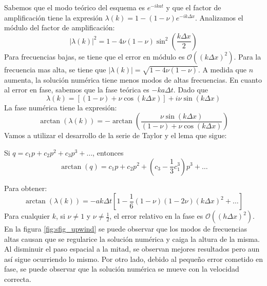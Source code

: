 \documentclass[spanish]{mathnotes}
\begin{document}
	Sabemos que el modo teórico del esquema es $e^{-ik at}$ y que el factor de amplificación tiene la expresión $\lambda(k) = 1-(1-\nu) e^{-ik\Delta x}$. Analizamos el módulo del factor de amplificación:
	$$|\lambda(k)|^2= 1-4\nu (1-\nu)\sin^2\left(\frac{k\Delta x}{2}\right)$$
	Para frecuencias bajas, se tiene que el error en módulo es $\mathcal{O}((k\Delta x)^2)$. Para la frecuencia mas alta, se tiene que $|\lambda(k)| = \sqrt{1-4\nu(1-\nu)}$. 
	A medida que $n$ aumenta, la solución numérica tiene menos modos de altas frecuencias.
	En cuanto al error en fase, sabemos que la fase teórica es $-ka\Delta t$. 
	Dado que 
	$$\lambda(k)=\left[(1-\nu)+\nu \cos(k\Delta x)\right] + i\nu \sin(k\Delta x)$$
	La fase numérica tiene la expresión:
	$$\arctan(\lambda(k)) = -\arctan\left(\frac{\nu \sin(k\Delta x)}{(1-\nu)+\nu \cos(k\Delta x)}\right)$$
	Vamos a utilizar el desarrollo de la serie de Taylor y el lema que sigue:
	\begin{lemma}
		Si $q=c_1p+c_2p^2+c_3p^3+\hdots$, entonces
		$$\arctan(q) = c_1p+c_2p^2+(c_3-\frac{1}{3}c_1^3)p^3+\hdots$$
	\end{lemma}
	Para obtener:
	$$\arctan(\lambda(k)) = -ak\Delta t\left[1-\frac{1}{6}(1-\nu)(1-2\nu)(k\Delta x)^2+\hdots \right]$$
	Para cualquier $k$, si $\nu \neq 1$ y $\nu \neq \frac{1}{2}$, el error relativo en la fase es $\mathcal{O}((h\Delta x)^2)$.
	En la figura \ref{fig:sfig_upwind} se puede observar que los modos de frecuencias altas causan que se regularice la solución numérica y caiga la altura de la misma. Al disminuir el paso espacial a la mitad, se observan mejores resultados pero aun así sigue ocurriendo lo mismo. Por otro lado, debido al pequeño error cometido en fase, se puede observar que la solución numérica se mueve con la velocidad correcta.
	
	
	
	
	
	
	
	
	
\end{document}
